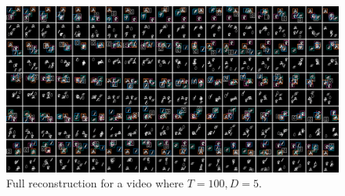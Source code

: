 \documentclass{article}
\theoremstyle{definition}
\begin{document}
\begin{figure}[!h]
\includegraphics[width=170mm]{figures/T=100-D=5-2.pdf}
\caption{Full reconstruction for a video where $T=100, D=5$.}
\end{figure}
\end{document}

